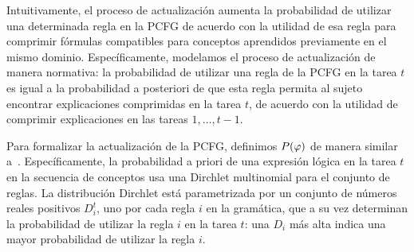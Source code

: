 
Intuitivamente, el proceso de actualización aumenta la probabilidad de utilizar una determinada regla en la PCFG de acuerdo con la utilidad de esa regla para comprimir fórmulas compatibles para conceptos aprendidos previamente en el mismo dominio. Específicamente, modelamos el proceso de actualización de manera normativa: la probabilidad de utilizar una regla de la PCFG en la tarea $t$ es igual a la probabilidad a posteriori de que esta regla permita al sujeto encontrar explicaciones comprimidas en la tarea $t$, de acuerdo con la utilidad de comprimir explicaciones en las tareas $1,\dots,t-1$.


Para formalizar la actualización de la PCFG, definimos $P(\varphi)$ de manera similar a~\cite{goodman2008rational}. Específicamente, la probabilidad a priori de una expresión lógica en la tarea $t$ en la secuencia de conceptos usa una Dirchlet multinomial para el conjunto de reglas. La distribución Dirchlet está parametrizada por un conjunto de números reales positivos $D_{i}^{t}$, uno por cada regla $i$ en la gramática, que a su vez determinan la probabilidad de utilizar la regla $i$ en la tarea $t$: una $D_{i}$ más alta indica una mayor probabilidad de utilizar la regla $i$.


